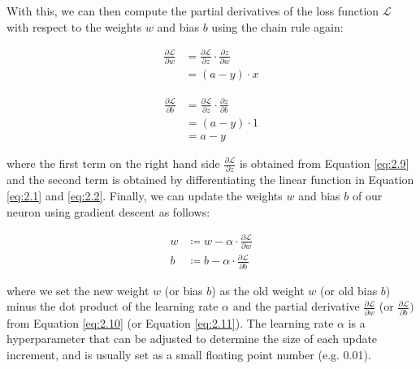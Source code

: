 With this, we can then compute the partial derivatives of the loss function $\mathcal{L}$ with respect to the weights $w$ and bias $b$ using the chain rule again:

\begin{equation}\label{eq:2.10}
  \begin{aligned}
    \frac{\partial{\mathcal{L}}}{\partial{w}} & = \frac{\partial{\mathcal{L}}}{\partial{z}} \cdot \frac{\partial{z}}{\partial{w}} \\
    & = (a-y) \cdot x
  \end{aligned}
\end{equation}

\begin{equation}\label{eq:2.11}
  \begin{aligned}
    \frac{\partial{\mathcal{L}}}{\partial{b}} & = \frac{\partial{\mathcal{L}}}{\partial{z}} \cdot \frac{\partial{z}}{\partial{b}} \\
    & = (a-y) \cdot 1 \\
    & = a - y
  \end{aligned}
\end{equation}

where the first term on the right hand side $\frac{\partial{\mathcal{L}}}{\partial{z}}$ is obtained from Equation \eqref{eq:2.9} and the second term is obtained by differentiating the linear function in Equation \eqref{eq:2.1} and \eqref{eq:2.2}.
Finally, we can update the weights $w$ and bias $b$ of our neuron using gradient descent as follows:

\begin{equation}\label{eq:2.12}
  \begin{aligned}
    w & \coloneqq w - \alpha \cdot \frac{\partial{\mathcal{L}}}{\partial{w}} \\
    b & \coloneqq b - \alpha \cdot \frac{\partial{\mathcal{L}}}{\partial{b}}
  \end{aligned}
\end{equation}

where we set the new weight $w$ (or bias $b$) as the old weight $w$ (or old bias $b$) minus the dot product of the learning rate $\alpha$ and the partial derivative $\frac{\partial{\mathcal{L}}}{\partial{w}}$ (or $\frac{\partial{\mathcal{L}}}{\partial{b}})$ from Equation \eqref{eq:2.10} (or Equation \eqref{eq:2.11}).
The learning rate $\alpha$ is a hyperparameter that can be adjusted to determine the size of each update increment, and is usually set as a small floating point number (e.g. 0.01).

